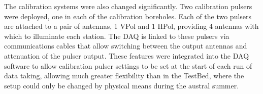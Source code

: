 The calibration systems were also changed significantly. Two calibration pulsers were deployed, one in each of the calibration boreholes. Each of the two pulsers are attached to a pair of antennas, 1 VPol and 1 HPol, providing 4 antennas with which to illuminate each station. The DAQ is linked to these pulsers via communications cables that allow switching between the output antennas and attenuation of the pulser output. These features were integrated into the DAQ software to allow calibration pulser settings to be set at the start of each run of data taking, allowing much greater flexibility than in the TestBed, where the setup could only be changed by physical means during the austral summer.

%
%





